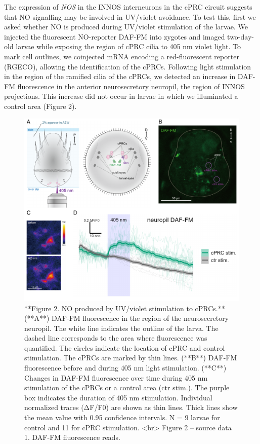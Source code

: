 \documentclass[
  10pt,
  onecolumn]{article}
\begin{document}
The expression of \emph{NOS} in the INNOS interneurons in the cPRC
circuit suggests that NO signalling may be involved in
UV/violet-avoidance. To test this, first we asked whether NO is produced
during UV/violet stimulation of the larvae. We injected the fluorescent
NO-reporter DAF-FM into zygotes and imaged two-day-old larvae while
exposing the region of cPRC cilia to 405 nm violet light. To mark cell
outlines, we coinjected mRNA encoding a red-fluorescent reporter
(RGECO), allowing the identification of the cPRCs. Following light
stimulation in the region of the ramified cilia of the cPRCs, we
detected an increase in DAF-FM fluorescence in the anterior
neurosecretory neuropil, the region of INNOS projections. This increase
did not occur in larvae in which we illuminated a control area (Figure
2).

\begin{figure}
\includegraphics[width=29.17in]{figures/Fig2} \caption{**Figure 2. NO produced by UV/violet stimulation to cPRCs.** (**A**) DAF-FM fluorescence in the region of the neurosecretory neuropil. The white line indicates the outline of the larva. The dashed line corresponds to the area where fluorescence was quantified. The circles indicate the location of cPRC and control stimulation. The cPRCs are marked by thin lines. (**B**) DAF-FM fluorescence before and during 405 nm light stimulation. (**C**) Changes in DAF-FM fluorescence over time during 405 nm stimulation of the cPRCs or a control area (ctr stim.). The purple box indicates the duration of 405 nm stimulation. Individual normalized traces (ΔF/F0) are shown as thin lines. Thick lines show the mean value with 0.95 confidence intervals. N = 9 larvae for control and 11 for cPRC stimulation. <br> Figure 2 -- source data 1. DAF-FM fluorescence reads.}\label{fig:unnamed-chunk-2}
\end{figure}
\end{document}
